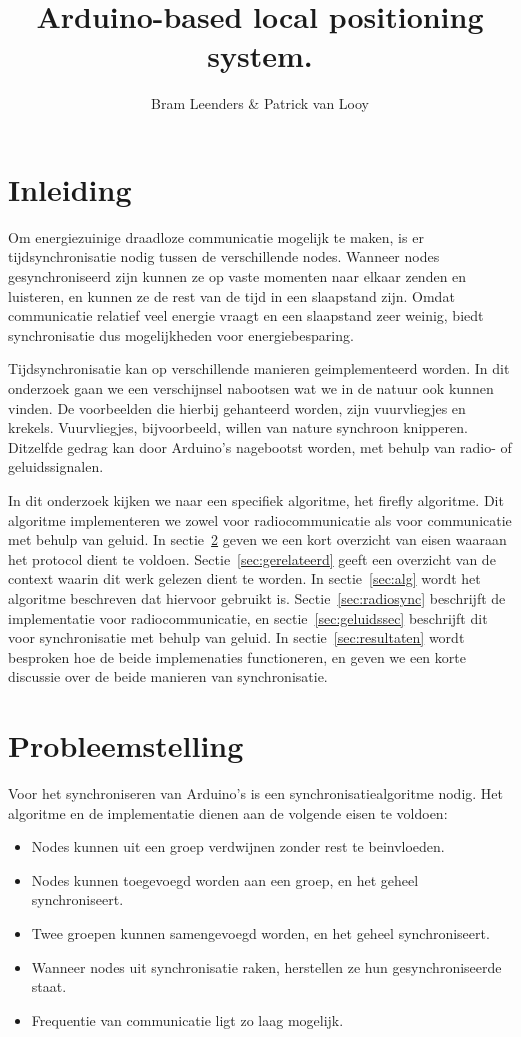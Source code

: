 \documentclass[a4paper,10pt]{article}
\title{Arduino-based local positioning system.}
\author{Bram Leenders \& Patrick van Looy}
\begin{document}
\maketitle

\section{Inleiding}
Om energiezuinige draadloze communicatie mogelijk te maken, is er tijdsynchronisatie nodig tussen de verschillende nodes. Wanneer nodes gesynchroniseerd zijn kunnen ze op vaste momenten naar elkaar zenden en luisteren, en kunnen ze de rest van de tijd in een slaapstand zijn. Omdat communicatie relatief veel energie vraagt en een slaapstand zeer weinig, biedt synchronisatie dus mogelijkheden voor energiebesparing.

Tijdsynchronisatie kan op verschillende manieren geimplementeerd worden. In dit onderzoek gaan we een verschijnsel nabootsen wat we in de natuur ook kunnen vinden. De voorbeelden die hierbij gehanteerd worden, zijn vuurvliegjes en krekels. Vuurvliegjes, bijvoorbeeld, willen van nature synchroon knipperen\cite{buck1988synchronous}. Ditzelfde gedrag kan door Arduino's nagebootst worden, met behulp van radio- of geluidssignalen.

In dit onderzoek kijken we naar een specifiek algoritme, het firefly algoritme\cite{leidenfrost2009firefly, yang2013firefly}. Dit algoritme implementeren we zowel voor radiocommunicatie als voor communicatie met behulp van geluid. In sectie~\ref{sec:probleemstelling} geven we een kort overzicht van eisen waaraan het protocol dient te voldoen. Sectie~\ref{sec:gerelateerd} geeft een overzicht van de context waarin dit werk gelezen dient te worden. In sectie~\ref{sec:alg} wordt het algoritme beschreven dat hiervoor gebruikt is. Sectie~\ref{sec:radiosync} beschrijft de implementatie voor radiocommunicatie, en sectie~\ref{sec:geluidssec} beschrijft dit voor synchronisatie met behulp van geluid. In sectie~\ref{sec:resultaten} wordt besproken hoe de beide implemenaties functioneren, en geven we een korte discussie over de beide manieren van synchronisatie.

\section{Probleemstelling}\label{sec:probleemstelling}
Voor het synchroniseren van Arduino's is een synchronisatiealgoritme nodig. Het algoritme en de implementatie dienen aan de volgende eisen te voldoen:
\begin{itemize}
    \item Nodes kunnen uit een groep verdwijnen zonder rest te beinvloeden.
    \item Nodes kunnen toegevoegd worden aan een groep, en het geheel synchroniseert.
    \item Twee groepen kunnen samengevoegd worden, en het geheel synchroniseert.
    \item Wanneer nodes uit synchronisatie raken, herstellen ze hun gesynchroniseerde staat.
    \item Frequentie van communicatie ligt zo laag mogelijk.
\end{itemize}
\end{document}
